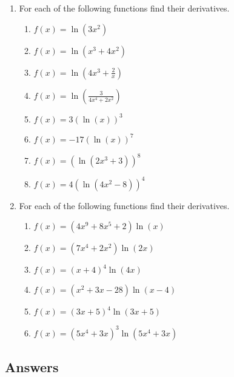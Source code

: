 \documentclass[a4paper,12pt]{article}
\begin{document}
\begin{enumerate}
\item For each of the following functions find their derivatives.
    \begin{multicols}{2}
    \begin{enumerate}
    \item \spacer$f(x) = \ln(3x^2)$
    \item \spacer$f(x) = \ln(x^3 + 4x^2)$
    \item \spacer$f(x) = \ln\left(4x^3 + \frac{2}{x}\right)$
    \item \spacer$f(x) = \ln\left(\frac{3}{4x^4 + 2x^2}\right)$
    \item \spacer$f(x) = 3(\ln(x))^3$
    \item \spacer$f(x) = -17(\ln(x))^7$
    \item \spacer$f(x) = (\ln(2x^3 + 3))^8$
    \item \spacer$f(x) = 4(\ln(4x^2 - 8))^4$
    \end{enumerate}
    \end{multicols}

\item For each of the following functions find their derivatives.
    \begin{multicols}{2}
    \begin{enumerate}
    \item \sspacer$f(x) = (4x^9 + 8x^5 + 2)\ln(x)$
    \item \sspacer$f(x) = (7x^4 + 2x^2)\ln(2x)$
    \item \sspacer$f(x) = (x + 4)^4\ln(4x)$
    \item \sspacer$f(x) = (x^2 + 3x - 28)\ln(x-4)$
    \item \sspacer$f(x) = (3x + 5)^4\ln(3x+5)$
    \item \sspacer$f(x) = (5x^4 + 3x)^3\ln(5x^4 + 3x)$
    \end{enumerate}
    \end{multicols}

\end{enumerate}
\newpage
\subsection*{Answers}
\end{document}
